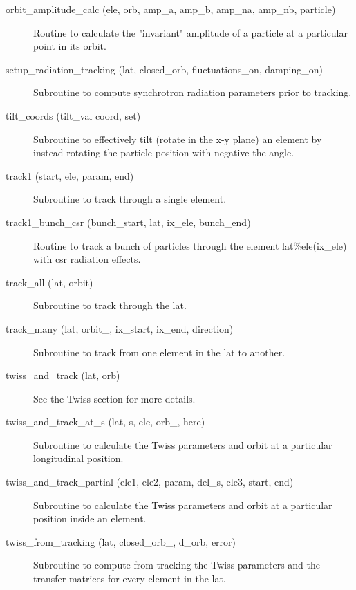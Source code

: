 \begin{description}
\item[orbit_amplitude_calc (ele, orb, amp_a, amp_b, amp_na, amp_nb, particle)] \Newline
Routine to calculate the "invariant" amplitude of a particle at a 
particular point in its orbit. 

\item[setup_radiation_tracking (lat, closed_orb, fluctuations_on, damping_on)] \Newline
Subroutine to compute synchrotron radiation parameters prior to tracking. 

\item[tilt_coords (tilt_val coord, set)] \Newline
Subroutine to effectively tilt (rotate in the x-y plane) an element by 
instead rotating the particle position with negative the angle. 

\item[track1 (start, ele, param, end)] \Newline
Subroutine to track through a single element. 

\item[track1_bunch_csr (bunch_start, lat, ix_ele, bunch_end)] \Newline 
Routine to track a bunch of particles through the element lat\%ele(ix_ele)
with csr radiation effects.

\item[track_all (lat, orbit)] \Newline
Subroutine to track through the lat. 

\item[track_many (lat, orbit_, ix_start, ix_end, direction)] \Newline
Subroutine to track from one element in the lat to another. 

\item[twiss_and_track (lat, orb)] \Newline
See the Twiss section for more details. 

\item[twiss_and_track_at_s (lat, s, ele, orb_, here)] \Newline
Subroutine to calculate the Twiss parameters and orbit at a particular longitudinal position. 

\item[twiss_and_track_partial (ele1, ele2, param, del_s, ele3, start, end)] \Newline
Subroutine to calculate the Twiss parameters and orbit at a particular position inside an element. 

\item[twiss_from_tracking (lat, closed_orb_, d_orb, error)] \Newline
Subroutine to compute from tracking the Twiss parameters and the transfer matrices 
for every element in the lat. 

\end{description}

